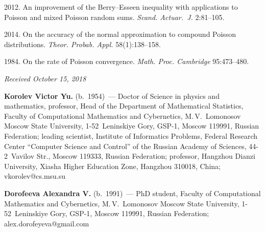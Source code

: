 \begin{multicols}{2}
{{\begin{thebibliography}{99}
 2012. An improvement of the
Berry--Esseen inequality with applications to Poisson and mixed
Poisson random sums. \textit{Scand. Actuar.~J.} 2:81--105.

 2014. On the accuracy of the normal approximation to
compound Poisson distributions. \textit{Theor. Probab. Appl.} 58(1):138--158.

 1984. On the rate of Poisson convergence.
\textit{Math. Proc. Cambridge} 95:473--480.

\end{thebibliography}

 }
 }

\end{multicols}

\vspace*{-6pt}

\hfill{\small\textit{Received October 15, 2018}}



\Contr

\noindent
\textbf{Korolev Victor Yu.} (b.\ 1954)~--- Doctor of Science 
in physics and mathematics, professor, Head of the Department of Mathematical 
Statistics, Faculty of Computational Mathematics and Cybernetics, M.\,V.~Lomonosov 
Moscow State University, 1-52~Leninskiye Gory, GSP-1, Moscow 119991, 
Russian Federation; leading scientist, Institute of Informatics Problems, 
Federal Research Center ``Computer Science and Control'' 
of the Russian Academy of Sciences, 44-2~Vavilov Str., Moscow 119333, 
Russian Federation; professor, Hangzhou Dianzi University, Xiasha Higher 
Education Zone, Hangzhou 310018, China; \mbox{vkorolev@cs.msu.su}

\vspace*{3pt}

\noindent
\textbf{Dorofeeva Alexandra V.} (b.\ 1991)~--- 
PhD student, Faculty of Computational Mathematics and Cybernetics, 
M.\,V.~Lomonosov Moscow State University, 1-52~Leninskiye Gory, GSP-1, Moscow 119991, 
Russian Federation; \mbox{alex.dorofeyeva@gmail.com}
\label{end\stat}

\renewcommand{\bibname}{\protect\rm Литература}       